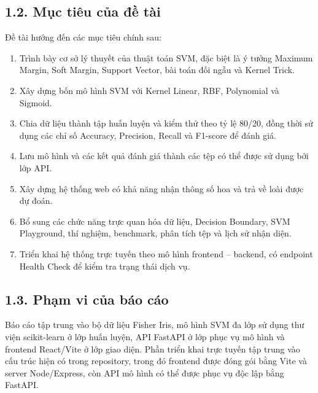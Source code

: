 \documentclass{article}
\begin{document}
	\subsection{1.2. Mục tiêu của đề tài}
	\hspace{0.5cm}
	Đề tài hướng đến các mục tiêu chính sau:
	\begin{enumerate}
		\item Trình bày cơ sở lý thuyết của thuật toán SVM, đặc biệt là ý tưởng Maximum Margin, Soft Margin, Support Vector, bài toán đối ngẫu và Kernel Trick.
		\item Xây dựng bốn mô hình SVM với Kernel Linear, RBF, Polynomial và Sigmoid.
		\item Chia dữ liệu thành tập huấn luyện và kiểm thử theo tỷ lệ 80/20, đồng thời sử dụng các chỉ số Accuracy, Precision, Recall và F1-score để đánh giá.
		\item Lưu mô hình và các kết quả đánh giá thành các tệp có thể được sử dụng bởi lớp API.
		\item Xây dựng hệ thống web có khả năng nhận thông số hoa và trả về loài được dự đoán.
		\item Bổ sung các chức năng trực quan hóa dữ liệu, Decision Boundary, SVM Playground, thí nghiệm, benchmark, phân tích tệp và lịch sử nhận diện.
		\item Triển khai hệ thống trực tuyến theo mô hình frontend -- backend, có endpoint Health Check để kiểm tra trạng thái dịch vụ.
	\end{enumerate}
	
	\subsection{1.3. Phạm vi của báo cáo}
	\hspace{0.5cm}
	Báo cáo tập trung vào bộ dữ liệu Fisher Iris, mô hình SVM đa lớp sử dụng thư viện scikit-learn ở lớp huấn luyện, API FastAPI ở lớp phục vụ mô hình và frontend React/Vite ở lớp giao diện. Phần triển khai trực tuyến tập trung vào cấu trúc hiện có trong repository, trong đó frontend được đóng gói bằng Vite và server Node/Express, còn API mô hình có thể được phục vụ độc lập bằng FastAPI.
	
\end{document}
